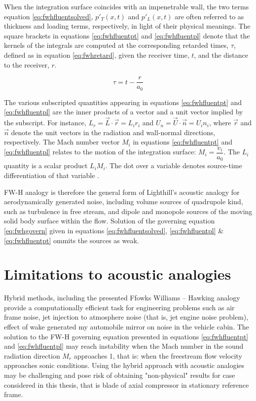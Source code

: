 When the integration surface coincides with an impenetrable wall, the two terms equation \ref{eq:fwhfluentsolved}, $ p'_T(x, t)$ and $p'_L(x, t)$ are often referred to as thickness and loading terms, respectively, in light of their physical meanings. The square brackets in equations \ref{eq:fwhfluentpt} and \ref{eq:fwhfluentpl} denote that the kernels of the integrals are computed at the corresponding retarded times, $\tau$, defined as in equation \ref{eq:fwhretard}, given the receiver time, $t$, and the distance to the receiver, $r$.

\begin{equation} \label{eq:fwhretard}
\tau = t - \frac{r}{a_0}
\end{equation}

The various subscripted quantities appearing in equations \ref{eq:fwhfluentpt} and \ref{eq:fwhfluentpl} are the inner products of a vector and a unit vector implied by the subscript. For instance, $L_r = \vec{L} \cdot \vec{r} = L_i r_i$ and $U_n = \vec{U} \cdot \vec{n} = U_i n_i$, where $\vec{r}$ and $\vec{n}$ denote the unit vectors in the radiation and wall-normal directions, respectively. The Mach number vector $M_i$ in equations \ref{eq:fwhfluentpt} and \ref{eq:fwhfluentpl} relates to the motion of the integration surface: $M_i = \dfrac{v_i}{a_0}$. The $L_i$ quantity is a scalar product $L_i M_i$. The dot over a variable denotes source-time differentiation of that variable \citep{fluenttheory} \citep{FWH} \citep{fwhaiaa}.

FW-H analogy is therefore the general form of Lighthill's acoustic analogy for aerodynamically generated noise, including volume sources of quadrupole kind, such as turbulence in free stream, and dipole and monopole sources of the moving solid body surface within the flow. Solution of the governing equation \ref{eq:fwhgovern} given in equations \ref{eq:fwhfluentsolved}, \ref{eq:fwhfluentpl} \& \ref{eq:fwhfluentpt} ommits the sources as weak. 

\section{Limitations to acoustic analogies}
Hybrid methods, including the presented Ffowks Williams -- Hawking analogy provide a computationally efficient task for engineering problems such as air frame noise, jet injection to atmosphere noise (that is, jet engine noise problem), effect of wake generated my automobile mirror on noise in the vehicle cabin. The solution to the FW-H governing equation presented in equations \ref{eq:fwhfluentpt} and \ref{eq:fwhfluentpl} may reach instability when the Mach number in the sound radiation direction $M_r$ approaches 1, that is: when the freestream flow velocity approaches sonic conditions. Using the hybrid approach with acoustic analogies may be challenging and pose risk of obtaining "non-physical" results for case considered in this thesis, that is blade of axial compressor in stationary reference frame.

